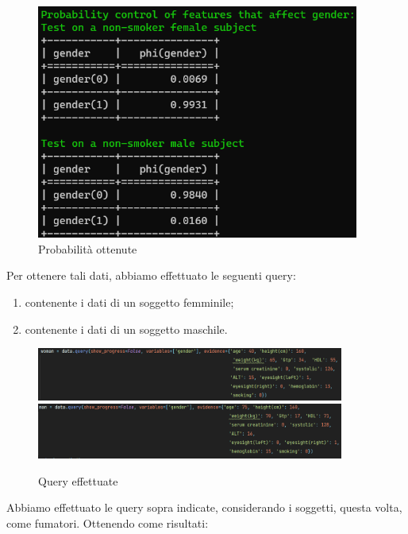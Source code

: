 \documentclass{article}
\begin{document}
\begin{figure}[H]
        \includegraphics[width=10.6cm]{notSmokeGen}
        \centering
        \caption{Probabilità ottenute}
        \centering
\end{figure}

Per ottenere tali dati, abbiamo effettuato le seguenti query:
\begin{enumerate}
    \item contenente i dati di un soggetto femminile;
    \item contenente i dati di un soggetto maschile.
\end{enumerate}
\begin{figure}[H]
        \includegraphics[width=0.9\textwidth]{queryWomanNoTSmoke}
        \includegraphics[width=0.9\textwidth]{queryManNoTSmoke}
        \centering
        \caption{Query effettuate}
        \centering
\end{figure}
%

Abbiamo effettuato le query sopra indicate, considerando i soggetti, questa volta, come fumatori.
Ottenendo come risultati:
\end{document}
